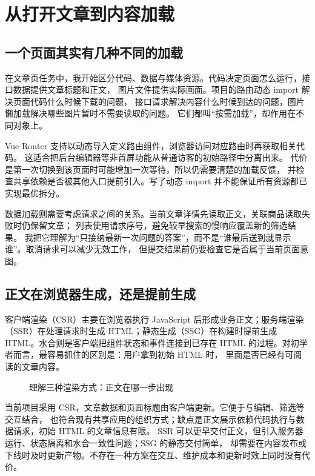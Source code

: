 \section{从打开文章到内容加载}
\subsection{一个页面其实有几种不同的加载}
在文章页任务中，我开始区分代码、数据与媒体资源。代码决定页面怎么运行，接口数据提供文章标题和正文，%
图片文件提供实际画面。项目的路由动态 import 解决页面代码什么时候下载的问题，%
接口请求解决内容什么时候到达的问题，图片懒加载解决哪些图片暂时不需要读取的问题。%
它们都叫“按需加载”，却作用在不同对象上。

Vue Router 支持以动态导入定义路由组件，浏览器访问对应路由时再获取相关代码\cite{router-lazy}。%
这适合把后台编辑器等非首屏功能从普通访客的初始路径中分离出来。%
代价是第一次切换到该页面时可能增加一次等待，所以仍需要清楚的加载反馈，%
并检查共享依赖是否被其他入口提前引入。写了动态 import 并不能保证所有资源都已实现最优拆分。

数据加载则需要考虑请求之间的关系。当前文章详情先读取正文，关联商品读取失败时仍保留文章；%
列表使用请求序号，避免较早搜索的慢响应覆盖新的筛选结果\cite{local-code}。%
我把它理解为“只接纳最新一次问题的答案”，而不是“谁最后送到就显示谁”。取消请求可以减少无效工作，%
但提交结果前仍要检查它是否属于当前页面意图。

\subsection{正文在浏览器生成，还是提前生成}
客户端渲染（CSR）主要在浏览器执行 JavaScript 后形成业务正文；服务端渲染（SSR）在处理请求时生成
HTML；静态生成（SSG）在构建时提前生成 HTML\cite{vue-ssr}。水合则是客户端把组件状态和事件连接到已存在
HTML 的过程。对初学者而言，最容易抓住的区别是：用户拿到初始 HTML 时，%
里面是否已经有可阅读的文章内容。

\begin{figure}[H]
\centering

\caption{理解三种渲染方式：正文在哪一步出现}%
\label{fig:render-path}
\end{figure}

当前项目采用 CSR，文章数据和页面标题由客户端更新。它便于与编辑、筛选等交互结合，%
也符合现有共享应用的组织方式；缺点是正文展示依赖代码执行与数据请求，初始 HTML 的文章信息有限。%
SSR 可以更早交付正文，但引入服务器运行、状态隔离和水合一致性问题；SSG 的静态交付简单，%
却需要在内容发布或下线时及时更新产物。不存在一种方案在交互、维护成本和更新时效上同时没有代价。

